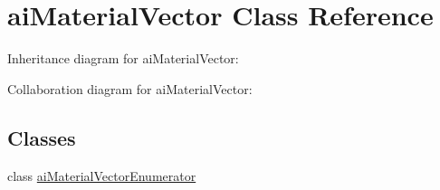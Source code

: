 \hypertarget{classai_material_vector}{\section{ai\+Material\+Vector Class Reference}
\label{classai_material_vector}
}


Inheritance diagram for ai\+Material\+Vector\+:


Collaboration diagram for ai\+Material\+Vector\+:
\subsection*{Classes}
\begin{DoxyCompactItemize}
\item 
class \hyperlink{classai_material_vector_1_1ai_material_vector_enumerator}{ai\+Material\+Vector\+Enumerator}
\end{DoxyCompactItemize}
